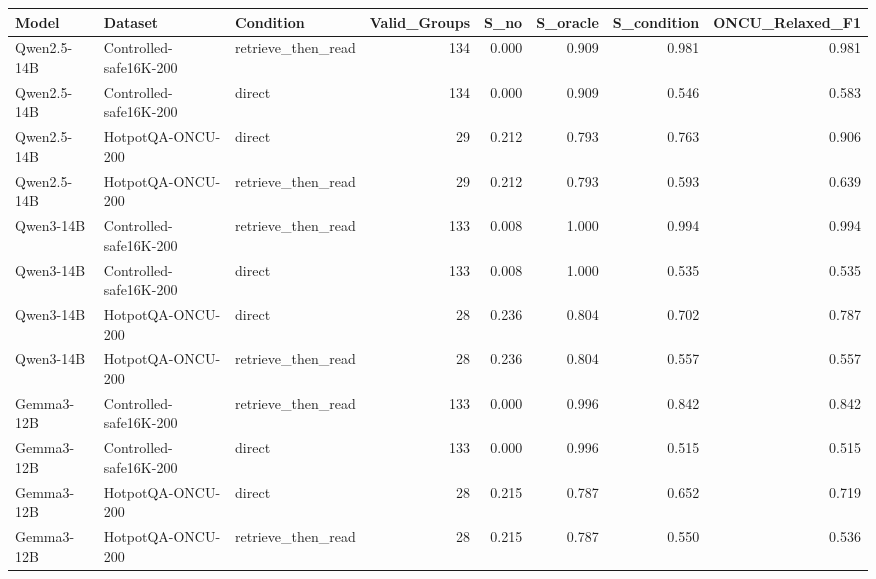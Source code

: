 \begin{tabular}{lllrrrrr}
\toprule
Model & Dataset & Condition & Valid_Groups & S_no & S_oracle & S_condition & ONCU_Relaxed_F1 \\
\midrule
Qwen2.5-14B & Controlled-safe16K-200 & retrieve_then_read & 134 & 0.000 & 0.909 & 0.981 & 0.981 \\
Qwen2.5-14B & Controlled-safe16K-200 & direct & 134 & 0.000 & 0.909 & 0.546 & 0.583 \\
Qwen2.5-14B & HotpotQA-ONCU-200 & direct & 29 & 0.212 & 0.793 & 0.763 & 0.906 \\
Qwen2.5-14B & HotpotQA-ONCU-200 & retrieve_then_read & 29 & 0.212 & 0.793 & 0.593 & 0.639 \\
Qwen3-14B & Controlled-safe16K-200 & retrieve_then_read & 133 & 0.008 & 1.000 & 0.994 & 0.994 \\
Qwen3-14B & Controlled-safe16K-200 & direct & 133 & 0.008 & 1.000 & 0.535 & 0.535 \\
Qwen3-14B & HotpotQA-ONCU-200 & direct & 28 & 0.236 & 0.804 & 0.702 & 0.787 \\
Qwen3-14B & HotpotQA-ONCU-200 & retrieve_then_read & 28 & 0.236 & 0.804 & 0.557 & 0.557 \\
Gemma3-12B & Controlled-safe16K-200 & retrieve_then_read & 133 & 0.000 & 0.996 & 0.842 & 0.842 \\
Gemma3-12B & Controlled-safe16K-200 & direct & 133 & 0.000 & 0.996 & 0.515 & 0.515 \\
Gemma3-12B & HotpotQA-ONCU-200 & direct & 28 & 0.215 & 0.787 & 0.652 & 0.719 \\
Gemma3-12B & HotpotQA-ONCU-200 & retrieve_then_read & 28 & 0.215 & 0.787 & 0.550 & 0.536 \\
\bottomrule
\end{tabular}
